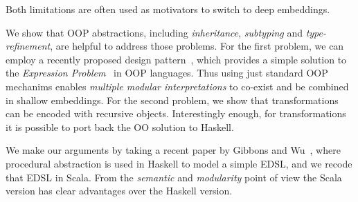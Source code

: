 \noindent Both limitations are often used as motivators to switch to deep embeddings.

We show that OOP abstractions, including \emph{
  inheritance}, \emph{subtyping} and \emph{type-refinement}, are
helpful to address those problems. For the first problem, we can
employ a recently proposed design pattern~\cite{eptrivially16}, which provides a simple
solution to the \emph{Expression Problem}~\cite{expPb} in OOP languages. Thus
using just standard OOP mechanims enables \emph{multiple modular
  interpretations} to co-exist and be combined in shallow embeddings.
For the second problem, we show that transformations can be encoded 
with recursive objects. Interestingly enough, for transformations it
is possible to port back the OO solution to
Haskell.

We make our arguments by taking a recent paper by Gibbons and Wu~\cite{gibbons2014folding},
where procedural abstraction is used in Haskell to model a simple
EDSL, and we recode that EDSL in Scala. From the \emph{semantic} and \emph{modularity} point of view the
Scala version has clear advantages over the Haskell version.

\begin{comment}
In summary, our contributions are:

\begin{itemize}

\item {}

\item {\bf Multiple Modular Interpretations for Shallow Embeddings:} 
  We show that with standard OOP mechanisms it is easy to support multiple modular
  interpretations for shallow embeddings.

\item {\bf Transformations for Shallow Embeddings:} We show that
  transformations are encodable with recursive objects. Moreover, this technique
  can be ported back into functional programming as well.

\end{itemize}
\end{comment}
